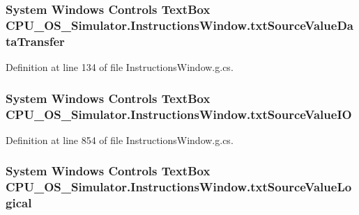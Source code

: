 \subsubsection[{txt\+Source\+Value\+Data\+Transfer}]{\setlength{\rightskip}{0pt plus 5cm}System Windows Controls Text\+Box C\+P\+U\+\_\+\+O\+S\+\_\+\+Simulator.\+Instructions\+Window.\+txt\+Source\+Value\+Data\+Transfer\hspace{0.3cm}{\ttfamily [package]}}\label{class_c_p_u___o_s___simulator_1_1_instructions_window_a44cd8a2732d939d1746051f8b2093500}


Definition at line 134 of file Instructions\+Window.\+g.\+cs.

\hypertarget{class_c_p_u___o_s___simulator_1_1_instructions_window_a14161b7bebd71e7545b59f77f6254a26}{}
\subsubsection[{txt\+Source\+Value\+I\+O}]{\setlength{\rightskip}{0pt plus 5cm}System Windows Controls Text\+Box C\+P\+U\+\_\+\+O\+S\+\_\+\+Simulator.\+Instructions\+Window.\+txt\+Source\+Value\+I\+O\hspace{0.3cm}{\ttfamily [package]}}\label{class_c_p_u___o_s___simulator_1_1_instructions_window_a14161b7bebd71e7545b59f77f6254a26}


Definition at line 854 of file Instructions\+Window.\+g.\+cs.

\hypertarget{class_c_p_u___o_s___simulator_1_1_instructions_window_afac2309550dd6f1f1589dc7451e8f878}{}
\subsubsection[{txt\+Source\+Value\+Logical}]{\setlength{\rightskip}{0pt plus 5cm}System Windows Controls Text\+Box C\+P\+U\+\_\+\+O\+S\+\_\+\+Simulator.\+Instructions\+Window.\+txt\+Source\+Value\+Logical\hspace{0.3cm}{\ttfamily [package]}}\label{class_c_p_u___o_s___simulator_1_1_instructions_window_afac2309550dd6f1f1589dc7451e8f878}


